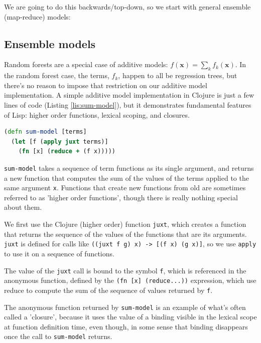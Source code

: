 \documentclass[10pt,openany]{article}
\numberwithin{definition}{section}
\numberwithin{example}{section}
\numberwithin{equation}{section}
\numberwithin{figure}{section}
\begin{document}
We are going to do this backwards/top-down, so we start with general
ensemble (map-reduce) models:


\subsection{Ensemble models}

Random forests are a special case of additive models: 
$f(\mathbf{x})=\sum_{k}f_{k}(\mathbf{x})$.
In the random forest case, the terms, $f_{k}$, happen to all be regression
trees, but there's no reason to impose that restriction on our additive
model implementation. A simple additive model implementation in Clojure
is just a few lines of code (Listing \ref{lis:sum-model}), but it
demonstrates fundamental features of Lisp: higher order functions,
lexical scoping, and closures.

\begin{lstlisting}[caption={Sum additive model},label={lis:sum-model},language=clojure,tabsize=2]
(defn sum-model [terms] 
  (let [f (apply juxt terms)]
    (fn [x] (reduce + (f x)))))
\end{lstlisting}

\texttt{sum-model} takes a sequence of term functions as its single
argument, and returns a new function that computes the sum of the
values of the terms applied to the same argument \texttt{x}. Functions
that create new functions from old are sometimes referred to as 'higher
order functions', though there is really nothing special about them. 

We first use the Clojure (higher order) function \texttt{juxt}, which
creates a function that returns the sequence of the values of the
functions that are its arguments. \texttt{juxt} is defined for calls
like \texttt{((juxt~f~g)~x) -> {[}(f~x)~(g~x){]}}, so we use
\texttt{apply} to use it on a sequence of functions. 

The value of the \texttt{juxt} call is bound to the symbol \texttt{f},
which is referenced in the anonymous function, defined by the \texttt{(fn~{[}x{]}~(reduce...))}
expression, which use reduce to compute the sum of the sequence of
values returned by \texttt{f}.

The anonymous function returned by \texttt{sum-model} is an example
of what's often called a 'closure', because it uses the value of a
binding visible in the lexical scope at function definition time,
even though, in some sense that binding disappears once the call to
\texttt{sum-model} returns.
\end{document}
